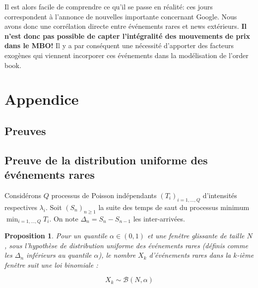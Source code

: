 \documentclass[12pt,a4paper]{article}
\newtheorem{proposition}[theorem]{Proposition}
\theoremstyle{definition}
\theoremstyle{remark}
\begin{document}
Il est alors facile de comprendre ce qu'il se passe en réalité: ces jours correspondent à l'annonce de nouvelles importante concernant Google. Nous avons donc une corrélation directe entre événements rares et news extérieurs. \textbf{Il n'est donc pas possible de capter l'intégralité des mouvements de prix dans le MBO!} Il y a par conséquent une nécessité d'apporter des facteurs exogènes qui viennent incorporer ces événements dans la modélisation de l'order book.




    
    
    \newpage
    \section*{Appendice}
    \vspace*{2cm}
    \subsection*{Preuves}
    \subsection*{Preuve de la distribution uniforme des événements rares}

    Considérons $Q$ processus de Poisson indépendants $(T_i)_{i=1,\ldots,Q}$ d'intensités respectives $\lambda_i$. Soit $(S_n)_{n\geq 1}$ la suite des temps de saut du processus minimum $\min_{i=1,\ldots,Q} T_i$. On note $\Delta_n = S_n - S_{n-1}$ les inter-arrivées.

    \begin{proposition}
    Pour un quantile $\alpha \in (0,1)$ et une fenêtre glissante de taille $N$, sous l'hypothèse de distribution uniforme des événements rares (définis comme les $\Delta_n$ inférieurs au quantile $\alpha$), le nombre $X_k$ d'événements rares dans la $k$-ième fenêtre suit une loi binomiale :

    \[
    X_k \sim \mathcal{B}(N, \alpha)
    \]
    \end{proposition}
\end{document}
